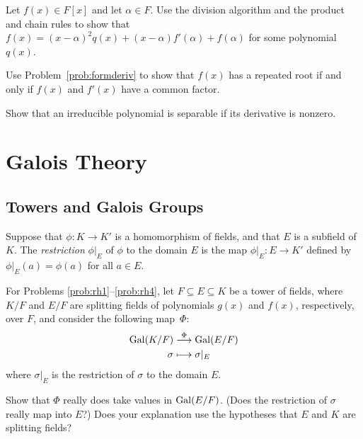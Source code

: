 \begin{problem}\label{prob:formderiv}
Let $f(x) \in F[x]$ and let $\alpha \in F$.  Use the division algorithm and the product and chain rules to show that $f(x) = (x-\alpha)^2 q(x) +(x-\alpha)f'(\alpha) + f(\alpha)$ for some polynomial $q(x)$.
\end{problem}



\begin{problem}
    Use Problem~\ref{prob:formderiv} to show that $f(x)$ has a repeated root if and only if $f(x)$ and $f'(x)$ have a common factor.
\end{problem}



\begin{problem}
    Show that an irreducible polynomial is separable if its derivative is nonzero.
\end{problem}

\chapter{Galois Theory}

\section{Towers and Galois Groups}

\begin{definition}
    Suppose that $\phi:K \longrightarrow K'$ is a homomorphism of fields, and that $E$ is a subfield of $K$. The \textit{restriction} $\phi|_E$ of $\phi$ to the domain $E$ is the map $\phi|_E : E \longrightarrow K'$ defined by $\phi|_E(a)=\phi(a)$ for all $a\in E$.
\end{definition}

For Problems \ref{prob:rh1}--\ref{prob:rh4},
let $F\subseteq E\subseteq K$ be a tower of fields, where $K/F$ and $E/F$ are splitting fields of polynomials $g(x)$ and $f(x)$, respectively, over $F$, and consider the following map~$\Phi$:
\begin{align*}
\operatorname{Gal}(K/F) &\stackrel{\Phi}{\longrightarrow} \operatorname{Gal}(E/F) \\
\sigma &\longmapsto \sigma|_E
\end{align*}
where $\sigma|_E$ is the restriction of $\sigma$ to the domain $E$.

\begin{problem}\label{prob:rh1}
    Show that $\Phi$ really does take values in $\operatorname{Gal}(E/F)$. (Does the restriction of $\sigma$ really map into $E$?) Does your explanation use the hypotheses that $E$ and $K$ are splitting fields?
\end{problem}


